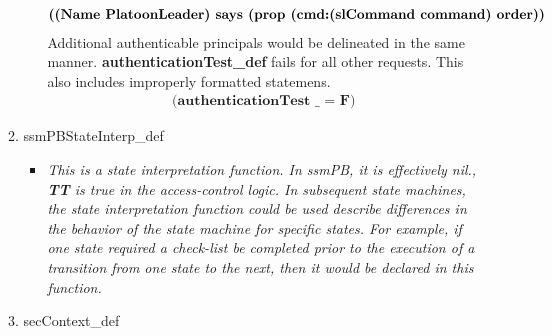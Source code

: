 \begin{enumerate}
\begin{enumerate}
\begin{itemize}
{\begin{align*}
          \textbf{((Name\ PlatoonLeader)\ says\ (prop\ (cmd:(slCommand\ command)\ order))\;}
        \end{align*}
        Additional authenticable principals would be delineated in the same manner.
        \textbf{authenticationTest_def} fails for all other requests.  This also includes
        improperly formatted statemens.
        \begin{align*}
          \textbf{(authenticationTest\ \_\  =\ F)}
          \end{align*}
      }
    \end{itemize}
  \item ssmPBStateInterp_def
    \begin{itemize}
    \item \textit{This is a state interpretation function.  In ssmPB, it is effectively nil., \textbf{TT}
      is true in the access-control logic.   In subsequent state machines, the state interpretation
      function could be used describe differences in the behavior of the state machine for
      specific states.  For example, if one state required a check-list be completed prior to
      the execution of a transition from one state to the next, then it would be declared in
      this function.\ \\}
    \end{itemize}
    \item secContext_def
      \begin{itemize}
        

\end{itemize}
\end{enumerate}
\end{enumerate}
